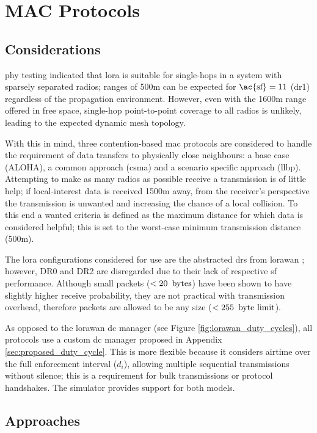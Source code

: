 \chapter{MAC Protocols}\label{sec:protocols}
\section{Considerations}\label{sec:mac_considerations}
\ac{phy} testing indicated that \ac{lora} is suitable for single-hops in a system with sparsely separated radios; ranges of 500m can be expected for $\text{\ac{sf}}=11$ (\ac{dr}1) regardless of the propagation environment. However, even with the 1600m range offered in free space, single-hop point-to-point coverage to all radios is unlikely, leading to the expected dynamic mesh topology.

With this in mind, three contention-based \ac{mac} protocols are considered to handle the requirement of data transfers to physically close neighbours: a base case (ALOHA), a common approach (\ac{csma}) and a scenario specific approach (\ac{llbp}). Attempting to make as many radios as possible receive a transmission is of little help; if local-interest data is received 1500m away, from the receiver's perspective the transmission is unwanted and increasing the chance of a local collision. To this end a wanted criteria is defined as the maximum distance for which data is considered helpful; this is set to the worst-case minimum transmission distance (500m).

The \ac{lora} configurations considered for use are the abstracted \ac{dr}s from \ac{lorawan} \cite{3YP:LORAWAN_REGIONAL_PARAMS}; however, DR0 and DR2 are disregarded due to their lack of respective \ac{sf} performance. Although small packets ($< 20\enskip \text{bytes}$) have been shown to have slightly higher receive probability, they are not practical with transmission overhead, therefore packets are allowed to be any size ($< 255\enskip \text{byte limit}$). 

As opposed to the \ac{lorawan} \ac{dc} manager (see Figure \ref{fig:lorawan_duty_cycles}), all protocols use a custom \ac{dc} manager proposed in Appendix \ref{sec:proposed_duty_cycle}. This is  more flexible because it considers airtime over the full enforcement interval ($d_i$), allowing multiple sequential transmissions without silence; this is a requirement for bulk transmissions or protocol handshakes. The simulator provides support for both models.
\section{Approaches}


